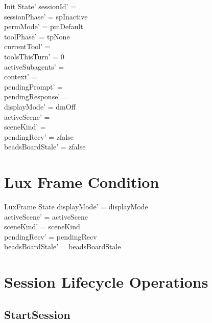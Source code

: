\documentclass[a4paper,10pt,fleqn]{article}
\begin{document}
\begin{schema}{Init}
  State'
  \where
  sessionId' = \emptyset \\
  sessionPhase' = spInactive \\
  permMode' = pmDefault \\
  toolPhase' = tpNone \\
  currentTool' = \emptyset \\
  toolsThisTurn' = 0 \\
  activeSubagents' = \emptyset \\
  context' = \langle \rangle \\
  pendingPrompt' = \emptyset \\
  pendingResponse' = \emptyset \\
  displayMode' = dmOff \\
  activeScene' = \emptyset \\
  sceneKind' = \emptyset \\
  pendingRecv' = zfalse \\
  beadsBoardStale' = zfalse
\end{schema}

\section{Lux Frame Condition}

\begin{schema}{LuxFrame}
  \Delta State
  \where
  displayMode' = displayMode \\
  activeScene' = activeScene \\
  sceneKind' = sceneKind \\
  pendingRecv' = pendingRecv \\
  beadsBoardStale' = beadsBoardStale
\end{schema}

\section{Session Lifecycle Operations}

\subsection{StartSession}
\end{document}
